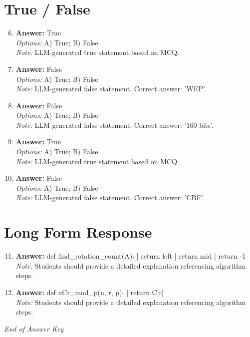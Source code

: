 \documentclass[12pt]{article}
\begin{document}
\section*{True / False}
\begin{enumerate}[label=\arabic*.]
\setcounter{enumi}{5}
\item \textbf{Answer:} True
\\ \textit{Options:} A) True; B) False
\\ \textit{Note:} LLM-generated true statement based on MCQ.
\item \textbf{Answer:} False
\\ \textit{Options:} A) True; B) False
\\ \textit{Note:} LLM-generated false statement. Correct answer: 'WEP'.
\item \textbf{Answer:} False
\\ \textit{Options:} A) True; B) False
\\ \textit{Note:} LLM-generated false statement. Correct answer: '160 bits'.
\item \textbf{Answer:} True
\\ \textit{Options:} A) True; B) False
\\ \textit{Note:} LLM-generated true statement based on MCQ.
\item \textbf{Answer:} False
\\ \textit{Options:} A) True; B) False
\\ \textit{Note:} LLM-generated false statement. Correct answer: 'CBF'.
\end{enumerate}

\section*{Long Form Response}
\begin{enumerate}[label=\arabic*.]
\setcounter{enumi}{10}
\item \textbf{Answer:} def find\_rotation\_count(A): | return left | return mid | return -1
\\ \textit{Note:} Students should provide a detailed explanation referencing algorithm steps.
\item \textbf{Answer:} def nCr\_mod\_p(n, r, p): | return C[r]
\\ \textit{Note:} Students should provide a detailed explanation referencing algorithm steps.
\end{enumerate}

\vfill
\noindent\textit{End of Answer Key}
\end{document}
